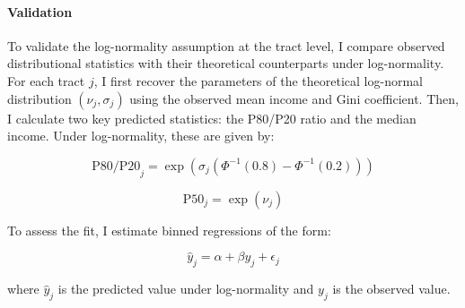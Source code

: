 \paragraph{Validation} To validate the log-normality assumption at the tract level, I compare observed distributional statistics with their theoretical counterparts under log-normality. For each tract $j$, I first recover the parameters of the theoretical log-normal distribution $(\nu_j, \sigma_j)$ using the observed mean income and Gini coefficient. Then, I calculate two key predicted statistics: the P80/P20 ratio and the median income. Under log-normality, these are given by:

\begin{equation}
\text{P80/P20}_j = \exp(\sigma_j(\Phi^{-1}(0.8) - \Phi^{-1}(0.2)))
\end{equation}

\begin{equation}
\text{P50}_j = \exp(\nu_j)
\end{equation}

To assess the fit, I estimate binned regressions of the form:

\begin{equation}
\hat{y}_j = \alpha + \beta y_j + \epsilon_j
\end{equation}

where $\hat{y}_j$ is the predicted value under log-normality and $y_j$ is the observed value.